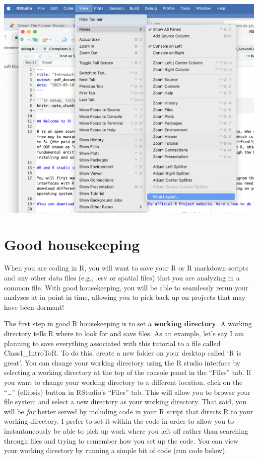 \documentclass[
]{book}
\begin{document}
\includegraphics{images:/01-intro/PaneLayout.png}

\hypertarget{good-housekeeping}{%
\section{Good housekeeping}\label{good-housekeeping}}

When you are coding in R, you will want to save your R or R markdown scripts and any other data files (e.g., .csv or spatial files) that you are analyzing in a common file. With good housekeeping, you will be able to seamlessly rerun your analyses at in point in time, allowing you to pick back up on projects that may have been dormant!

The first step in good R housekeeping is to set a \textbf{working directory}. A working directory tells R where to look for and save files. As an example, let's say I am planning to save everything associated with this tutorial to a file called Class1\_IntroToR. To do this, create a new folder on your desktop called `R is great'. You can change your working directory using the R studio interface by selecting a working directory at the top of the console panel in the ``Files'' tab. If you want to change your working directory to a different location, click on the ``\ldots{}'' (ellipsis) button in RStudio's ``Files'' tab. This will allow you to browse your file system and select a new directory as your working directory. That said, you will be \emph{far} better served by including code in your R script that directs R to your working directory. I prefer to set it within the code in order to allow you to instantaneously be able to pick up work where you left off rather than searching through files and trying to remember how you set up the code. You can view your working directory by running a simple bit of code (run code below).
\end{document}
